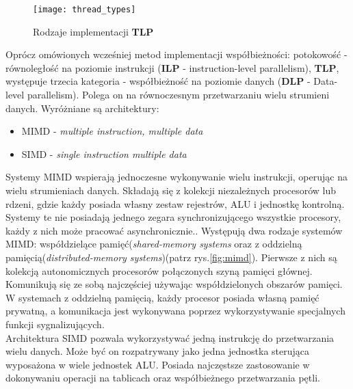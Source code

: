 \documentclass[document.tex]{subfiles}
\begin{document}
\begin{figure}[h]
\texttt{[image: thread\_types]}
\caption{Rodzaje implementacji \textbf{TLP}}
\label{fig:thread_types}
\end{figure}

\indent Oprócz omówionych wcześniej metod implementacji współbieżności: potokowość - równoległość na poziomie instrukcji
(\textbf{ILP} - instruction-level parallelism), \textbf{TLP},
występuje trzecia kategoria - współbieżność na poziomie danych
(\textbf{DLP} - Data-level parallelism). Polega on na równoczesnym przetwarzaniu wielu strumieni danych.
Wyróżniane są architektury:
\begin{itemize}
\item MIMD - \textit{multiple instruction, multiple data} 
\item SIMD - \textit{single instruction multiple data}
\end{itemize}
\indent Systemy MIMD wspierają jednoczesne wykonywanie wielu instrukcji, operując na wielu strumieniach danych. Składają się z kolekcji niezależnych procesorów lub rdzeni, gdzie każdy posiada własny zestaw rejestrów, ALU i jednostkę kontrolną. Systemy te nie posiadają jednego zegara synchronizującego wszystkie procesory, każdy z nich może pracować asynchronicznie.\cite{openmp_pacheco}\cite{OS_Stallings}.
Występują dwa rodzaje systemów MIMD: współdzielące pamięć(\textit{shared-memory systems} oraz
z oddzielną pamięcią(\textit{distributed-memory systems})(patrz rys.\ref{fig:mimd}).
Pierwsze z nich są kolekcją autonomicznych procesorów połączonych szyną pamięci głównej. Komunikują się ze sobą najczęściej używając współdzielonych obszarów pamięci.
W systemach z oddzielną pamięcią, każdy procesor posiada własną
pamięć prywatną, a komunikacja jest wykonywana poprzez wykorzystywanie specjalnych funkcji sygnalizujących.\cite{OS_Stallings}
\\
\indent Architektura SIMD pozwala wykorzystywać jedną instrukcję do przetwarzania wielu danych. Może być on rozpatrywany
jako jedna jednostka sterująca wyposażona w wiele jednostek ALU.
Posiada najczęstsze zastosowanie w dokonywaniu operacji na tablicach oraz współbieżnego przetwarzania pętli. 
\cite{Computer_Architecture_Patterson_Hennesy}\cite{openmp_pacheco}

\end{document}

